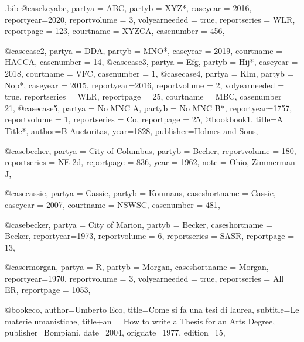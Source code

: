 \begin{filecontents*}[overwrite]{\jobname.bib}
@case{keyabc,
  partya = {ABC}, 
  partyb = {XYZ*},
  caseyear = {2016},
  reportyear={2020},
  reportvolume = {3},
  volyearneeded = {true},
  reportseries = {WLR},
  reportpage = {123},
  courtname = {XYZCA},
  casenumber = {456},
	}

@case{case2,
  partya = {DDA}, 
  partyb = {MNO*},
  caseyear = {2019},
  courtname = {HACCA},
  casenumber = {14},
	}
@case{case3,
  partya = {Efg}, 
  partyb = {Hij*},
  caseyear = {2018},
  courtname = {VFC},
  casenumber = {1},
	}
@case{case4,
  partya = {Klm}, 
  partyb = {Nop*},
  caseyear = {2015},
  reportyear={2016},
  reportvolume = {2},
  volyearneeded = {true},
  reportseries = {WLR},
  reportpage = {25},
  courtname = {MBC},
  casenumber = {21},
	}
@case{case5,
  partya = {No MNC A}, 
  partyb = {No MNC B*},
  reportyear={1757},
  reportvolume = {1},
  reportseries = {Co},
  reportpage = {25},
	}
@book{book1,
	title={A Title*},
	author={B Auctoritas},
	year={1828},
	publisher={Holmes and Sons},
	}



@case{becher,
  partya = {City of Columbus}, 
  partyb = {Becher},
  reportvolume = {180},
  reportseries = {NE 2d},
  reportpage = {836},
  year = {1962},
  note = {Ohio, Zimmerman J},
	}


@case{cassie,
  partya = {Cassie}, 
  partyb = {Koumans},
  caseshortname = {Cassie},
  caseyear = {2007},
  courtname = {NSWSC},
  casenumber = {481},
	}


@case{becker,
  partya = {City of Marion}, 
  partyb = {Becker},
  caseshortname = {Becker},
  reportyear={1973},
  reportvolume = {6},
  reportseries = {SASR},
  reportpage = {13},
	}

@case{rmorgan,
  partya = {R}, 
  partyb = {Morgan},
  caseshortname = {Morgan},
  reportyear={1970},
  reportvolume = {3},
  volyearneeded = {true},
  reportseries = {All ER},
  reportpage = {1053},
	}


@book{eco,
author={Umberto Eco},
title={Come si fa una tesi di laurea},
subtitle={Le materie umanistiche},
title+an = {How to write a Thesis for an Arts Degree},
publisher={Bompiani},
date={2004},
origdate={1977},
edition={15},
}


\end{filecontents*}
